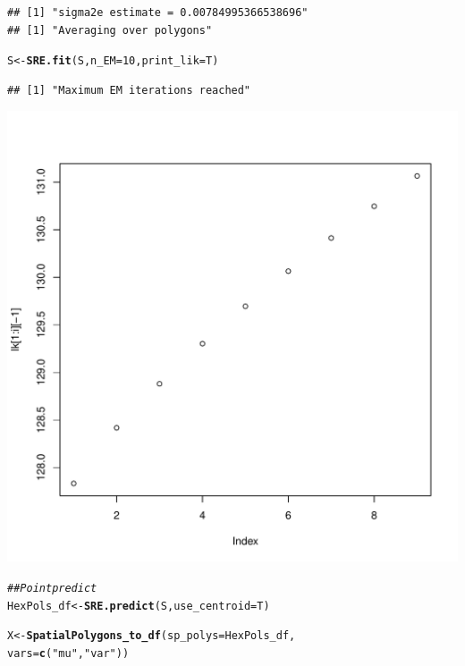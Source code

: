 \documentclass{article}\usepackage[]{graphicx}\usepackage[]{color}
\makeatletter
\def\maxwidth{ %
  \ifdim\Gin@nat@width>\linewidth
    \linewidth
  \else
    \Gin@nat@width
  \fi
}
\newcommand{\hlnum}[1]{\textcolor[rgb]{0.686,0.059,0.569}{#1}}%
\newcommand{\hlstr}[1]{\textcolor[rgb]{0.192,0.494,0.8}{#1}}%
\newcommand{\hlcom}[1]{\textcolor[rgb]{0.678,0.584,0.686}{\textit{#1}}}%
\newcommand{\hlstd}[1]{\textcolor[rgb]{0.345,0.345,0.345}{#1}}%
\newcommand{\hlkwb}[1]{\textcolor[rgb]{0.69,0.353,0.396}{#1}}%
\newcommand{\hlkwc}[1]{\textcolor[rgb]{0.333,0.667,0.333}{#1}}%
\newcommand{\hlkwd}[1]{\textcolor[rgb]{0.737,0.353,0.396}{\textbf{#1}}}%
\newenvironment{kframe}{%
 \def\at@end@of@kframe{}%
 \ifinner\ifhmode%
  \def\at@end@of@kframe{\end{minipage}}%
  \begin{minipage}{\columnwidth}%
 \fi\fi%
 \def\FrameCommand##1{\hskip\@totalleftmargin \hskip-\fboxsep
 \colorbox{shadecolor}{##1}\hskip-\fboxsep
     \hskip-\linewidth \hskip-\@totalleftmargin \hskip\columnwidth}%
 \MakeFramed {\advance\hsize-\width
   \@totalleftmargin\z@ \linewidth\hsize
   \@setminipage}}%
 {\par\unskip\endMakeFramed%
 \at@end@of@kframe}
\newenvironment{knitrout}{}{} %
\makeatother
\begin{document}
\begin{knitrout}
\begin{kframe}
{\ttfamily\noindent\color{warningcolor}{\#\# Warning in map\_data\_to\_BAUs(data[[i]], BAUs, av\_var = av\_var, variogram.formula = f): Not accounting for multiple data in the same grid box during variogram estimation. Need to see how to do this with gstat}}\begin{verbatim}
## [1] "sigma2e estimate = 0.00784995366538696"
## [1] "Averaging over polygons"
\end{verbatim}
\begin{alltt}
    \hlstd{S} \hlkwb{<-} \hlkwd{SRE.fit}\hlstd{(S,}\hlkwc{n_EM} \hlstd{=} \hlnum{10}\hlstd{,}\hlkwc{print_lik}\hlstd{=T)}
\end{alltt}
\begin{verbatim}
## [1] "Maximum EM iterations reached"
\end{verbatim}
\end{kframe}
\includegraphics[width=\maxwidth]{figure/unnamed-chunk-1-1} 
\begin{kframe}\begin{alltt}
    \hlcom{## Point predict}
    \hlstd{HexPols_df} \hlkwb{<-} \hlkwd{SRE.predict}\hlstd{(S,}\hlkwc{use_centroid} \hlstd{= T)}

    \hlstd{X} \hlkwb{<-} \hlkwd{SpatialPolygons_to_df}\hlstd{(}\hlkwc{sp_polys} \hlstd{= HexPols_df,}
                               \hlkwc{vars} \hlstd{=} \hlkwd{c}\hlstd{(}\hlstr{"mu"}\hlstd{,}\hlstr{"var"}\hlstd{))}
\end{alltt}



\end{kframe}
\end{knitrout}
\end{document}
